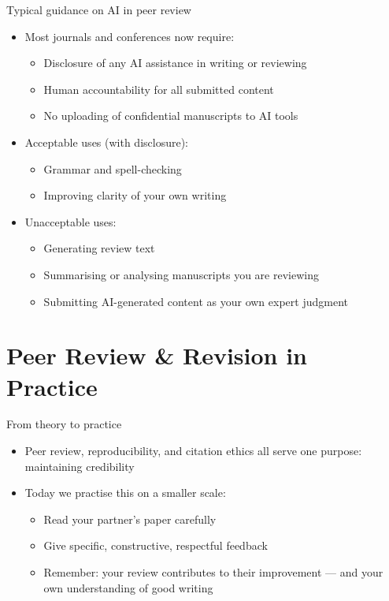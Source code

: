 \documentclass[aspectratio=169]{beamer}
\begin{document}
\begin{frame}{Typical guidance on AI in peer review}
\begin{itemize}
  \item Most journals and conferences now require:
    \begin{itemize}
      \item Disclosure of any AI assistance in writing or reviewing
      \item Human accountability for all submitted content
      \item No uploading of confidential manuscripts to AI tools
    \end{itemize}
  \item Acceptable uses (with disclosure):
    \begin{itemize}
      \item Grammar and spell-checking
      \item Improving clarity of your own writing
    \end{itemize}
  \item Unacceptable uses:
    \begin{itemize}
      \item Generating review text
      \item Summarising or analysing manuscripts you are reviewing
      \item Submitting AI-generated content as your own expert judgment
    \end{itemize}
\end{itemize}
\end{frame}

\section{Peer Review \& Revision in Practice}

\begin{frame}{From theory to practice}
\begin{itemize}
  \item Peer review, reproducibility, and citation ethics all serve one purpose: maintaining credibility
  \item Today we practise this on a smaller scale:
    \begin{itemize}
      \item Read your partner's paper carefully
      \item Give specific, constructive, respectful feedback
      \item Remember: your review contributes to their improvement — and your own understanding of good writing
    \end{itemize}
\end{itemize}
\end{frame}
\end{document}
